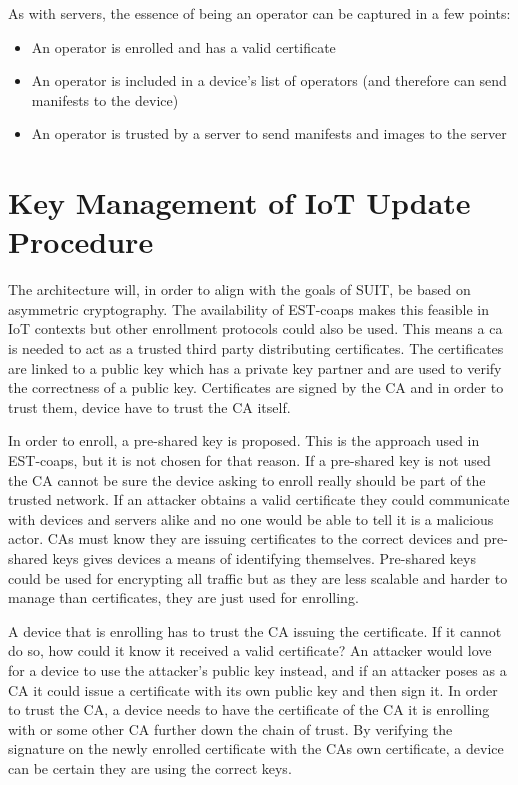 \documentclass[0-thesis.tex]{subfiles}
\begin{document}
As with servers, the essence of being an operator can be captured in a few points:

\begin{itemize}
    \item An operator is enrolled and has a valid certificate
    \item An operator is included in a device's list of operators (and therefore can send
            manifests to the device)
    \item An operator is trusted by a server to send manifests and images to the server
\end{itemize}

\section{Key Management of IoT Update Procedure}
\label{sec:key-management}
The architecture will, in order to align with the goals of SUIT, be based on asymmetric
cryptography. The availability of EST-coaps makes this feasible in IoT contexts but other
enrollment protocols could also be used. This means a \gls{ca} is needed to act as a
trusted third party distributing certificates. The certificates are linked to a public key
which has a private key partner and are used to verify the correctness of a public key.
Certificates are signed by the CA and in order to trust them, device have to trust the CA
itself.

In order to enroll, a pre-shared key is proposed. This is the approach used in EST-coaps,
but it is not chosen for that reason. If a pre-shared key is not used the CA cannot be
sure the device asking to enroll really should be part of the trusted network. If an
attacker obtains a valid certificate they could communicate with devices and servers alike
and no one would be able to tell it is a malicious actor. CAs must know they are issuing
certificates to the correct devices and pre-shared keys gives devices a means of
identifying themselves. Pre-shared keys could be used for encrypting all traffic but as
they are less scalable and harder to manage than certificates, they are just used for
enrolling.

A device that is enrolling has to trust the CA issuing the certificate. If it cannot do
so, how could it know it received a valid certificate? An attacker would love for a device
to use the attacker's public key instead, and if an attacker poses as a CA it could issue a
certificate with its own public key and then sign it. In order to trust the CA, a device
needs to have the certificate of the CA it is enrolling with or some other CA further down
the chain of trust. By verifying the signature on the newly enrolled certificate with the
CAs own certificate, a device can be certain they are using the correct keys.
\end{document}
